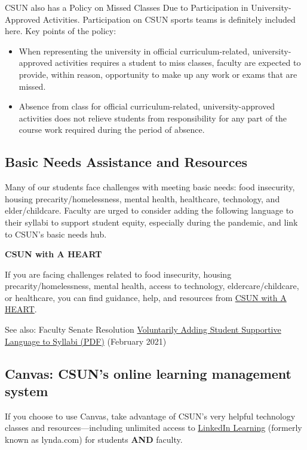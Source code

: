 \documentclass[
  letterpaper,
  DIV=11,
  numbers=noendperiod]{scrartcl}
\providecommand{\tightlist}{%
  \setlength{\itemsep}{0pt}\setlength{\parskip}{0pt}}\usepackage{longtable,booktabs,array}
\begin{document}
CSUN also has a Policy on Missed Classes Due to Participation in
University-Approved Activities. Participation on CSUN sports teams is
definitely included here. Key points of the policy:

\begin{itemize}
\tightlist
\item
  When representing the university in official curriculum-related,
  university-approved activities requires a student to miss classes,
  faculty are expected to provide, within reason, opportunity to make up
  any work or exams that are missed.
\item
  Absence from class for official curriculum-related,
  university-approved activities does not relieve students from
  responsibility for any part of the course work required during the
  period of absence.
\end{itemize}

\subsection{Basic Needs Assistance and
Resources}\label{basic-needs-assistance-and-resources}

Many of our students face challenges with meeting basic needs: food
insecurity, housing precarity/homelessness, mental health, healthcare,
technology, and elder/childcare. Faculty are urged to consider adding
the following language to their syllabi to support student equity,
especially during the pandemic, and link to CSUN's basic needs hub.

\textbf{CSUN with A HEART}

If you are facing challenges related to food insecurity, housing
precarity/homelessness, mental health, access to technology,
eldercare/childcare, or healthcare, you can find guidance, help, and
resources from \href{https://www.csun.edu/heart}{CSUN with A HEART}.

See also: Faculty Senate Resolution
\href{http://live-csu-northridge.pantheonsite.io}{Voluntarily Adding
Student Supportive Language to Syllabi (PDF)} (February 2021)

\subsection{Canvas: CSUN's online learning management
system}\label{canvas-csuns-online-learning-management-system}

If you choose to use Canvas, take advantage of CSUN's very helpful
technology classes and resources---including unlimited access to
\href{https://www.linkedin.com/learning/}{LinkedIn Learning} (formerly
known as lynda.com) for students \textbf{AND} faculty.
\end{document}
